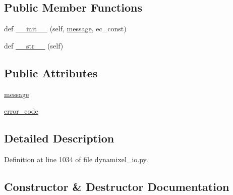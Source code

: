 \subsection*{Public Member Functions}
\begin{DoxyCompactItemize}
\item 
def \hyperlink{classdynamixel__driver_1_1dynamixel__io_1_1_nonfatal_error_code_error_a9fc3db82285dbc455ddaf3eed49e757f}{\+\_\+\+\_\+init\+\_\+\+\_\+} (self, \hyperlink{classdynamixel__driver_1_1dynamixel__io_1_1_nonfatal_error_code_error_a23dea0ce1b8b14db6409fd59646d6b0d}{message}, ec\+\_\+const)
\item 
def \hyperlink{classdynamixel__driver_1_1dynamixel__io_1_1_nonfatal_error_code_error_ae4bac8dd12f9006453cfe75be376dc1e}{\+\_\+\+\_\+str\+\_\+\+\_\+} (self)
\end{DoxyCompactItemize}
\subsection*{Public Attributes}
\begin{DoxyCompactItemize}
\item 
\hyperlink{classdynamixel__driver_1_1dynamixel__io_1_1_nonfatal_error_code_error_a23dea0ce1b8b14db6409fd59646d6b0d}{message}
\item 
\hyperlink{classdynamixel__driver_1_1dynamixel__io_1_1_nonfatal_error_code_error_a7c854098f4fc9fe03210d18c6cc9af6a}{error\+\_\+code}
\end{DoxyCompactItemize}


\subsection{Detailed Description}


Definition at line 1034 of file dynamixel\+\_\+io.\+py.



\subsection{Constructor \& Destructor Documentation}
\mbox{\label{classdynamixel__driver_1_1dynamixel__io_1_1_nonfatal_error_code_error_a9fc3db82285dbc455ddaf3eed49e757f}} 
